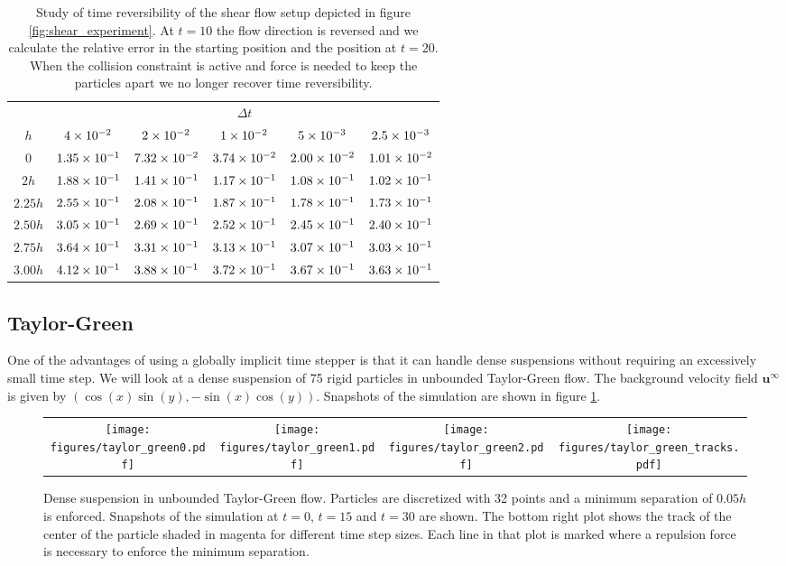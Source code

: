 \documentclass[preprint, 10pt]{elsarticle}
\begin{document}
\begin{table}[!h]
\begin{center}
\begin{tabular}{c| c c c c c}
$ $ & & & $\Delta t$ & &\\
$h$ & $4\times 10^{-2}$ &$ 2\times 10^{-2}$ & $1\times 10^{-2}$ & $5\times 10^{-3}$ & $2.5\times 10^{-3}$\\
\hline
0 & $1.35\times 10^{-1}$ & $7.32\times 10^{-2}$ & $3.74\times 10^{-2}$ & $2.00\times 10^{-2}$ & $1.01\times 10^{-2}$\\
$2h$ & $1.88\times 10^{-1}$ & $1.41\times 10^{-1}$ & $1.17\times 10^{-1}$ & $1.08\times 10^{-1}$ & $1.02\times 10^{-1}$\\
$2.25h$ & $2.55\times 10^{-1}$ & $2.08\times 10^{-1}$ & $1.87\times 10^{-1}$ & $1.78\times 10^{-1}$ & $1.73\times 10^{-1}$\\
$2.50h$ & $3.05\times 10^{-1}$ & $2.69\times 10^{-1}$ & $2.52\times 10^{-1}$ & $2.45\times 10^{-1}$ & $2.40\times 10^{-1}$\\
$2.75h$ & $3.64\times 10^{-1}$ & $3.31\times 10^{-1}$ & $3.13\times 10^{-1}$ & $3.07\times 10^{-1}$ & $3.03\times 10^{-1}$\\
$3.00h$ & $4.12\times 10^{-1}$ & $3.88\times 10^{-1}$ & $3.72\times 10^{-1}$ & $3.67\times 10^{-1}$ & $3.63\times 10^{-1}$
\end{tabular}
\end{center}
\caption{Study of time reversibility of the shear flow setup depicted in figure \ref{fig:shear_experiment}. At $t=10$ the flow direction is reversed and we calculate the relative error in the starting position and the position at $t=20$. When the collision constraint is active and force is needed to keep the particles apart we no longer recover time reversibility.}\label{tab:reverse}
\end{table}


\subsection{Taylor-Green}

One of the advantages of using a globally implicit time stepper is that it can handle dense suspensions without requiring an excessively small time step. We will look at a dense suspension of 75 rigid particles in unbounded Taylor-Green flow. The background velocity field $\mathbf{u}^\infty$ is given by $(\cos(x)\sin(y), -\sin(x)\cos(y))$. Snapshots of the simulation are shown in figure \ref{fig:taylor_green}. 

\begin{figure}[!h]
\begin{center}
\begin{tabular}{c c c c}
\texttt{[image: figures/taylor\_green0.pdf]} &
\texttt{[image: figures/taylor\_green1.pdf]}&
\texttt{[image: figures/taylor\_green2.pdf]} &
 \texttt{[image: figures/taylor\_green\_tracks.pdf]}
\end{tabular}
\end{center}
\caption{Dense suspension in unbounded Taylor-Green flow. Particles are discretized with 32 points and a minimum separation of $0.05h$ is enforced. Snapshots of the simulation at $t=0$, $t=15$ and $t=30$ are shown. The bottom right plot shows the track of the center of the particle shaded in magenta for different time step sizes. Each line in that plot is marked where a repulsion force is necessary to enforce the minimum separation. }\label{fig:taylor_green}
\end{figure}
\end{document}
